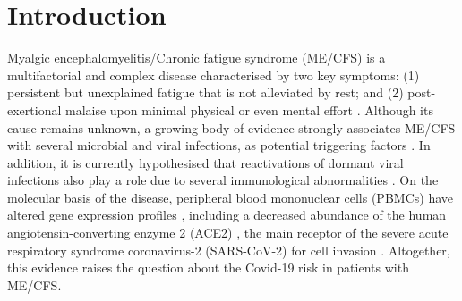 \section{Introduction}

Myalgic encephalomyelitis/Chronic fatigue syndrome (ME/CFS) is a multifactorial and complex disease characterised by two key symptoms: (1) persistent but unexplained fatigue that is not alleviated by rest; and (2) post-exertional malaise upon minimal physical or even mental effort \citep{fukuda1994ChronicFatigue, carruthers2003MyalgicEncephalomyelitis}. Although its cause remains unknown, a growing body of evidence strongly associates ME/CFS with several microbial and viral infections, as potential triggering factors \citep{chu2019OnsetPatterns, johnston2016EpidemiologicalCharacteristics}. In addition, it is currently hypothesised that reactivations of dormant viral infections also play a role \citep{rasa2018ChronicViral, ariza2021MyalgicEncephalomyelitis} due to several immunological abnormalities \citep{klimas1990ImmunologicAbnormalitiesa, lorussoImmunologicalAspectsChronic2009, brenuImmunologicalAbnormalitiesPotential2011}. On the molecular basis of the disease, peripheral blood mononuclear cells (PBMCs) have altered gene expression profiles \citep{kerr2008GeneExpression}, including a decreased abundance of the human angiotensin-converting enzyme 2 (ACE2) \citep{smithConvergentGenomicStudies2011}, the main receptor of the severe acute respiratory syndrome coronavirus-2 (SARS-CoV-2) for cell invasion \citep{li2003AngiotensinconvertingEnzyme, ge2013IsolationCharacterization, hoffmann2020SARSCoV2Cell}. Altogether, this evidence raises the question about the Covid-19 risk in patients with ME/CFS.

